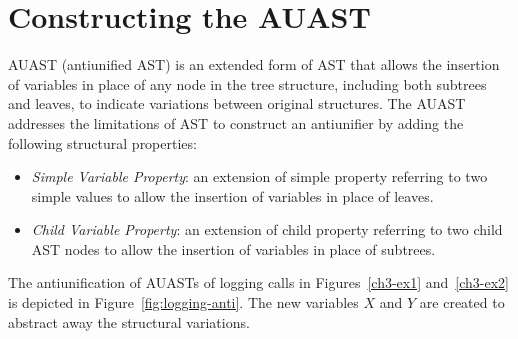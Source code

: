
\section{Constructing the AUAST} \label{AUAST}
AUAST (antiunified AST) is an extended form of AST that allows the insertion of variables in place of any node in the tree structure, including both subtrees and leaves, to indicate variations between original structures. The AUAST addresses the limitations of AST to construct an antiunifier by adding the following structural properties:
\begin{itemize} [leftmargin=.4in]
\item \textit{Simple Variable Property}: an extension of simple property referring to two simple values to allow the insertion of variables in place of leaves.
\end{itemize}
\begin{itemize} [leftmargin=.4in]
\item \textit{Child Variable Property}: an extension of child property referring to two child AST nodes to allow the insertion of variables in place of subtrees.
\end{itemize}
The antiunification of AUASTs of logging calls in Figures~\ref{ch3-ex1} and~\ref{ch3-ex2} is depicted in Figure~\ref{fig:logging-anti}. The new variables $X$ and $Y$ are created to abstract away the structural variations.


